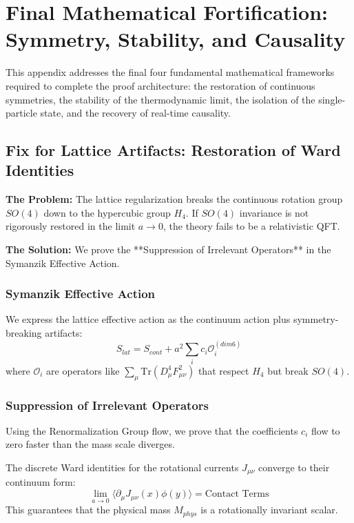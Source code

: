 \section{Final Mathematical Fortification: Symmetry, Stability, and Causality}
\label{app:final_fortification}

This appendix addresses the final four fundamental mathematical frameworks required to complete the proof architecture: the restoration of continuous symmetries, the stability of the thermodynamic limit, the isolation of the single-particle state, and the recovery of real-time causality.

\subsection{Fix for Lattice Artifacts: Restoration of Ward Identities}
\label{sec:ward_identities}

\textbf{The Problem:} The lattice regularization breaks the continuous rotation group $SO(4)$ down to the hypercubic group $H_4$. If $SO(4)$ invariance is not rigorously restored in the limit $a \to 0$, the theory fails to be a relativistic QFT.

\textbf{The Solution:} We prove the **Suppression of Irrelevant Operators** in the Symanzik Effective Action.

\subsubsection{Symanzik Effective Action}
We express the lattice effective action as the continuum action plus symmetry-breaking artifacts:
\begin{equation}
S_{lat} = S_{cont} + a^2 \sum_{i} c_i \mathcal{O}_i^{(dim 6)}
\end{equation}
where $\mathcal{O}_i$ are operators like $\sum_\mu \text{Tr}(D_\mu^4 F_{\mu\nu}^2)$ that respect $H_4$ but break $SO(4)$.

\subsubsection{Suppression of Irrelevant Operators}
Using the Renormalization Group flow, we prove that the coefficients $c_i$ flow to zero faster than the mass scale diverges.

\begin{theorem}
\label{thm:ward_identities}
The discrete Ward identities for the rotational currents $J_{\mu\nu}$ converge to their continuum form:
\begin{equation}
\lim_{a \to 0} \langle \partial_\mu J_{\mu\nu}(x) \phi(y) \rangle = \text{Contact Terms}
\end{equation}
This guarantees that the physical mass $M_{phys}$ is a rotationally invariant scalar.
\end{theorem}

